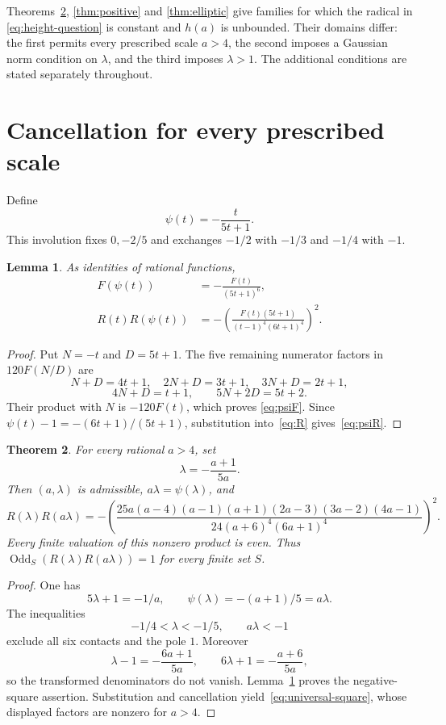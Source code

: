\documentclass[11pt,a4paper]{article}
\newtheorem{theorem}{Theorem}[section]
\newtheorem{lemma}[theorem]{Lemma}
\DeclareMathOperator{\Odd}{Odd}
\begin{document}
Theorems~\ref{thm:universal}, \ref{thm:positive} and
\ref{thm:elliptic} give families for which the radical in
\eqref{eq:height-question} is constant and $h(a)$ is unbounded.
Their domains differ: the first permits every prescribed scale $a>4$,
the second imposes a Gaussian norm condition on $\lambda$, and the
third imposes $\lambda>1$. The additional conditions are stated
separately throughout.

\section{Cancellation for every prescribed scale}

Define
\[
                         \psi(t)=-\frac{t}{5t+1}.
\]
This involution fixes $0,-2/5$ and exchanges $-1/2$ with $-1/3$
and $-1/4$ with $-1$.

\begin{lemma}\label{lem:negative-identity}
As identities of rational functions,
\begin{align}
 F(\psi(t))&=-\frac{F(t)}{(5t+1)^6},\label{eq:psiF}\\
 R(t)R(\psi(t))
 &=-\left(\frac{F(t)(5t+1)}{(t-1)^4(6t+1)^4}\right)^2.
       \label{eq:psiR}
\end{align}
\end{lemma}
\begin{proof}
Put $N=-t$ and $D=5t+1$. The five remaining numerator factors
in $120F(N/D)$ are
\[
 N+D=4t+1,\quad 2N+D=3t+1,\quad 3N+D=2t+1,
\]
\[
                    4N+D=t+1,\qquad 5N+2D=5t+2.
\]
Their product with $N$ is $-120F(t)$, which proves
\eqref{eq:psiF}. Since $\psi(t)-1=-(6t+1)/(5t+1)$,
substitution into~\eqref{eq:R} gives~\eqref{eq:psiR}.
\end{proof}

\begin{theorem}\label{thm:universal}
For every rational $a>4$, set
\[
                        \lambda=-\frac{a+1}{5a}.
\]
Then $(a,\lambda)$ is admissible, $a\lambda=\psi(\lambda)$,
and
\begin{equation}\label{eq:universal-square}
 R(\lambda)R(a\lambda)=
 -\left(
 \frac{25a(a-4)(a-1)(a+1)(2a-3)(3a-2)(4a-1)}
      {24(a+6)^4(6a+1)^4}\right)^2.
\end{equation}
Every finite valuation of this nonzero product is even. Thus
$\Odd_S(R(\lambda)R(a\lambda))=1$ for every finite set $S$.
\end{theorem}
\begin{proof}
One has
\[
 5\lambda+1=-1/a,\qquad
 \psi(\lambda)=-(a+1)/5=a\lambda.
\]
The inequalities
\[
                 -1/4<\lambda<-1/5,\qquad a\lambda<-1
\]
exclude all six contacts and the pole $1$. Moreover
\[
 \lambda-1=-\frac{6a+1}{5a},\qquad
 6\lambda+1=-\frac{a+6}{5a},
\]
so the transformed denominators do not vanish.
Lemma~\ref{lem:negative-identity} proves the negative-square assertion.
Substitution and cancellation yield~\eqref{eq:universal-square},
whose displayed factors are nonzero for $a>4$.
\end{proof}
\end{document}
